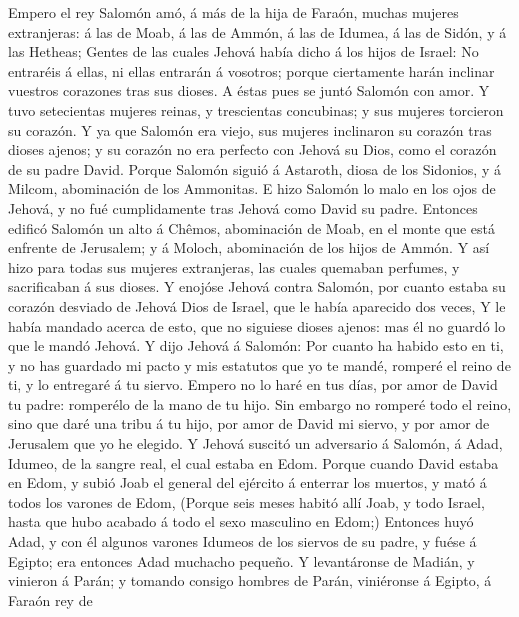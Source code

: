  Empero el rey Salomón amó, á más de la hija de Faraón,
muchas mujeres extranjeras: á las de Moab, á las de Ammón, á las de
Idumea, á las de Sidón, y á las Hetheas;  Gentes de las
cuales Jehová había dicho á los hijos de Israel: No entraréis á ellas,
ni ellas entrarán á vosotros; porque ciertamente harán inclinar vuestros
corazones tras sus dioses. A éstas pues se juntó Salomón con amor.
 Y tuvo setecientas mujeres reinas, y trescientas
concubinas; y sus mujeres torcieron su corazón.  Y ya que
Salomón era viejo, sus mujeres inclinaron su corazón tras dioses ajenos;
y su corazón no era perfecto con Jehová su Dios, como el corazón de su
padre David.  Porque Salomón siguió á Astaroth, diosa de
los Sidonios, y á Milcom, abominación de los Ammonitas.  E
hizo Salomón lo malo en los ojos de Jehová, y no fué cumplidamente tras
Jehová como David su padre.  Entonces edificó Salomón un
alto á Chêmos, abominación de Moab, en el monte que está enfrente de
Jerusalem; y á Moloch, abominación de los hijos de Ammón. 
Y así hizo para todas sus mujeres extranjeras, las cuales quemaban
perfumes, y sacrificaban á sus dioses.  Y enojóse Jehová
contra Salomón, por cuanto estaba su corazón desviado de Jehová Dios de
Israel, que le había aparecido dos veces,  Y le había
mandado acerca de esto, que no siguiese dioses ajenos: mas él no guardó
lo que le mandó Jehová.  Y dijo Jehová á Salomón: Por
cuanto ha habido esto en ti, y no has guardado mi pacto y mis estatutos
que yo te mandé, romperé el reino de ti, y lo entregaré á tu siervo.
 Empero no lo haré en tus días, por amor de David tu
padre: romperélo de la mano de tu hijo.  Sin embargo no
romperé todo el reino, sino que daré una tribu á tu hijo, por amor de
David mi siervo, y por amor de Jerusalem que yo he elegido.
 Y Jehová suscitó un adversario á Salomón, á Adad,
Idumeo, de la sangre real, el cual estaba en Edom. 
Porque cuando David estaba en Edom, y subió Joab el general del ejército
á enterrar los muertos, y mató á todos los varones de Edom,
 (Porque seis meses habitó allí Joab, y todo Israel,
hasta que hubo acabado á todo el sexo masculino en Edom;)
 Entonces huyó Adad, y con él algunos varones Idumeos de
los siervos de su padre, y fuése á Egipto; era entonces Adad muchacho
pequeño.  Y levantáronse de Madián, y vinieron á Parán; y
tomando consigo hombres de Parán, viniéronse á Egipto, á Faraón rey de
